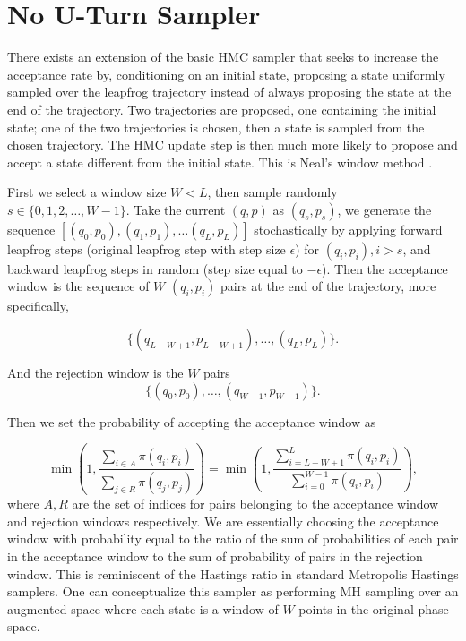 \documentclass[12pt]{report}
\begin{document}
\section{No U-Turn Sampler}


There exists an extension of the basic HMC sampler that seeks to increase the acceptance
rate by, conditioning on an initial state, proposing a state uniformly sampled over the leapfrog trajectory instead of always proposing the state at the end
of the trajectory. Two trajectories are proposed, one containing the initial state; one
of the two trajectories is chosen, then a state is sampled from the chosen
trajectory. The HMC update step is then much more likely to propose and accept
a state different from the initial state. This is Neal's window
method \cite{neal1992improved}. 

First we select a window size $W < L$, then sample randomly $s \in \{0, 1,2 , \dots , W -1 \}$. Take the current $(q,p)$ as $(q_s, p_s)$, we generate the sequence $[(q_0,p_0),(q_1, p_1), \dots (q_L,p_L)]$ stochastically by applying forward leapfrog steps (original leapfrog step with step size $\epsilon$) for $(q_i,p_i), i > s $, and backward leapfrog steps in random (step size equal to $-\epsilon$). 
Then the acceptance window is the sequence of $W$ $(q_i,p_i)$ pairs at the end of the trajectory, more specifically,

\[ \{(q_{L-W+1},p_{L-W+1}), \dots , (q_L,p_L)\}.\]

And the rejection window is the $W$ pairs 
\[ \{(q_0,p_0), \dots, (q_{W-1},p_{W-1})\}. \]

Then we set the probability of accepting the acceptance window as 

\[ \min (1, \frac{\sum_{i\in A} \pi(q_i,p_i)}{\sum_{j \in R} \pi(q_j,p_j) }) = \min (1, \frac{\sum_{i=L-W+1}^L \pi(q_i,p_i)}{\sum_{i=0}^{W-1}\pi(q_i,p_i)}), \]
where $A,R$ are the set of indices for pairs belonging to the acceptance window and rejection windows respectively. We are essentially choosing the acceptance window with probability equal to the ratio of the sum of probabilities of each pair in the acceptance window to the sum of probability of pairs in the rejection window. This is reminiscent of the Hastings ratio in standard Metropolis Hastings samplers. One can conceptualize this sampler as performing MH sampling over an augmented space where each state is a window of $W$ points in the original phase space.
\end{document}
